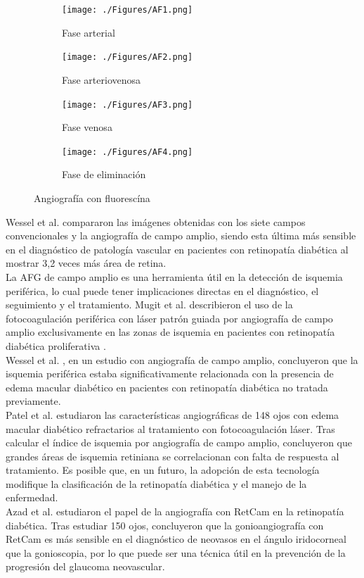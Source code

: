 \begin{figure}[H]
	\centering
	\begin{subfigure}[b]{0.45\textwidth}
        \texttt{[image: ./Figures/AF1.png]}
        \caption{Fase arterial}
        \label{fig:af1}
    \end{subfigure}
	\begin{subfigure}[b]{0.45\textwidth}
        \texttt{[image: ./Figures/AF2.png]}
        \caption{Fase arteriovenosa}
        \label{fig:af2}
    \end{subfigure}
	\begin{subfigure}[b]{0.45\textwidth}
        \texttt{[image: ./Figures/AF3.png]}
        \caption{Fase venosa}
        \label{fig:af3}
    \end{subfigure}
    	\begin{subfigure}[b]{0.45\textwidth}
        \texttt{[image: ./Figures/AF4.png]}
        \caption{Fase de eliminación}
        \label{fig:af4}
    \end{subfigure}
	\label{fig:retina}
	\caption{Angiograf\'ia con fluoresc\'ina}
\end{figure}

Wessel et al. \cite{wessel2012ultra} compararon las imágenes obtenidas con los siete campos convencionales y la angiografía de campo amplio, siendo esta última más sensible en el diagnóstico de patología vascular en pacientes con retinopatía diabética al mostrar 3,2 veces más área de retina.
\\
La AFG de campo amplio es una herramienta útil en la detección de isquemia periférica, lo cual puede tener implicaciones directas en el diagnóstico, el seguimiento y el tratamiento. 
Mugit et al. \cite{muqit2013optos} describieron el uso de la fotocoagulación periférica con láser patrón guiada por angiografía de campo amplio exclusivamente en las zonas de isquemia en pacientes con retinopatía diabética proliferativa .
\\
Wessel et al. \cite{wessel2012peripheral}, en un estudio con angiografía de campo amplio, concluyeron que la isquemia periférica estaba significativamente relacionada con la presencia de edema macular diabético en pacientes con retinopatía diabética no tratada previamente.
\\
Patel et al.  \cite{patel2013characterization} estudiaron las características angiográficas de 148 ojos con edema macular diabético refractarios al tratamiento con fotocoagulación láser. Tras calcular el índice de isquemia por angiografía de campo amplio, concluyeron que grandes áreas de isquemia retiniana se correlacionan con falta de respuesta al tratamiento. Es posible que, en un futuro, la adopción de esta tecnología modifique la clasificación de la retinopatía diabética y el manejo de la enfermedad.
\\
Azad et al. \cite{azad2013retcam} estudiaron el papel de la angiografía con RetCam en la retinopatía diabética. Tras estudiar 150 ojos, concluyeron que la gonioangiografía con RetCam es más sensible en el diagnóstico de neovasos en el ángulo iridocorneal que la gonioscopia, por lo que puede ser una técnica útil en la prevención de la progresión del glaucoma neovascular.

